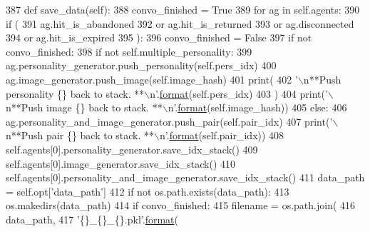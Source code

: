 \begin{DoxyCode}
387     \textcolor{keyword}{def }save\_data(self):
388         convo\_finished = \textcolor{keyword}{True}
389         \textcolor{keywordflow}{for} ag \textcolor{keywordflow}{in} self.agents:
390             \textcolor{keywordflow}{if} (
391                 ag.hit\_is\_abandoned
392                 \textcolor{keywordflow}{or} ag.hit\_is\_returned
393                 \textcolor{keywordflow}{or} ag.disconnected
394                 \textcolor{keywordflow}{or} ag.hit\_is\_expired
395             ):
396                 convo\_finished = \textcolor{keyword}{False}
397         \textcolor{keywordflow}{if} \textcolor{keywordflow}{not} convo\_finished:
398             \textcolor{keywordflow}{if} \textcolor{keywordflow}{not} self.multiple\_personality:
399                 ag.personality\_generator.push\_personality(self.pers\_idx)
400                 ag.image\_generator.push\_image(self.image\_hash)
401                 print(
402                     \textcolor{stringliteral}{'\(\backslash\)n**Push personality \{\} back to stack. **\(\backslash\)n'}.\hyperlink{namespaceparlai_1_1chat__service_1_1services_1_1messenger_1_1shared__utils_a32e2e2022b824fbaf80c747160b52a76}{format}(self.pers\_idx)
403                 )
404                 print(\textcolor{stringliteral}{'\(\backslash\)n**Push image \{\} back to stack. **\(\backslash\)n'}.\hyperlink{namespaceparlai_1_1chat__service_1_1services_1_1messenger_1_1shared__utils_a32e2e2022b824fbaf80c747160b52a76}{format}(self.image\_hash))
405             \textcolor{keywordflow}{else}:
406                 ag.personality\_and\_image\_generator.push\_pair(self.pair\_idx)
407                 print(\textcolor{stringliteral}{'\(\backslash\)n**Push pair \{\} back to stack. **\(\backslash\)n'}.\hyperlink{namespaceparlai_1_1chat__service_1_1services_1_1messenger_1_1shared__utils_a32e2e2022b824fbaf80c747160b52a76}{format}(self.pair\_idx))
408         self.agents[0].personality\_generator.save\_idx\_stack()
409         self.agents[0].image\_generator.save\_idx\_stack()
410         self.agents[0].personality\_and\_image\_generator.save\_idx\_stack()
411         data\_path = self.opt[\textcolor{stringliteral}{'data\_path'}]
412         \textcolor{keywordflow}{if} \textcolor{keywordflow}{not} os.path.exists(data\_path):
413             os.makedirs(data\_path)
414         \textcolor{keywordflow}{if} convo\_finished:
415             filename = os.path.join(
416                 data\_path,
417                 \textcolor{stringliteral}{'\{\}\_\{\}\_\{\}.pkl'}.\hyperlink{namespaceparlai_1_1chat__service_1_1services_1_1messenger_1_1shared__utils_a32e2e2022b824fbaf80c747160b52a76}{format}(

\end{DoxyCode}
